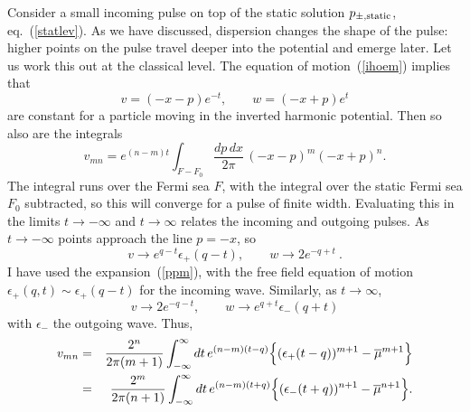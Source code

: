 Consider a small incoming pulse on top of the static
solution $p_{\pm,\rm static}$, eq.~(\ref{statlev}).  As we have
discussed, dispersion changes the shape of the pulse: higher points on
the pulse travel deeper into the potential and emerge later.  Let us
work this out at the classical level.  The equation of
motion~(\ref{ihoem}) implies that
\begin{equation}
v = (-x-p) e^{-t}, \qquad w = (-x+p) e^t
\end{equation}
are
constant for a particle moving in the inverted harmonic potential.
Then so also are the integrals
\begin{equation}
v_{mn} = e^{(n-m)t} \int_{F - F_0} \frac{dp\, dx}{2\pi}\, (-x-p)^m
(-x+p)^n . \label{vmn}
\end{equation}
The integral runs over the Fermi sea $F$, with the integral over the
static Fermi sea $F_0$ subtracted, so this will converge for a pulse
of finite width.
Evaluating this in the limits $t \to -\infty$
and $t \to \infty$ relates the incoming and outgoing pulses.  As $t
\to -\infty$ points approach the line $p = -x$, so
\begin{equation}
v \to e^{q-t} \epsilon_{+}(q - t), \qquad w \to 2 e^{- q + t}\ .
\end{equation}
I have used the expansion~(\ref{ppm}), with the free field equation
of motion $\epsilon_+(q,t) \sim \epsilon_{+}(q - t)$ for the incoming 
wave.  Similarly,
as $t \to \infty$,
\begin{equation}
v \to 2e^{-q-t}, \qquad w \to e^{q+t} \epsilon_{-}(q + t)
\end{equation}
with $\epsilon_-$ the outgoing wave.  Thus,
\begin{eqnarray}
v_{mn} &=& \frac{2^n}{2\pi(m+1)} \int_{-\infty}^\infty dt\,
e^{(n-m)(t-q)} 
\Bigl\{ (\epsilon_+(t-q))^{m+1} - \overline\mu^{m+1} \Bigr\}
\nonumber\\
&=& \frac{2^m}{2\pi(n+1)} \int_{-\infty}^\infty dt\,
e^{(n-m)(t+q)}
\Bigl\{ (\epsilon_-(t+q))^{n+1} - \overline\mu^{n+1} \Bigr\}. 
\label{vasym}
\end{eqnarray}

